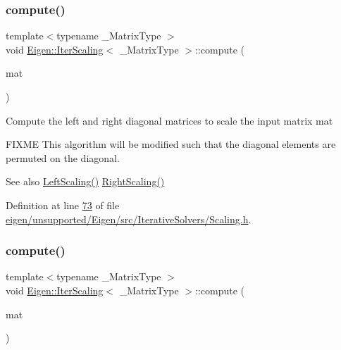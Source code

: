 \subsubsection{\texorpdfstring{compute()}{compute()}\hspace{0.1cm}{\footnotesize\ttfamily [1/2]}}
{\footnotesize\ttfamily template$<$typename \+\_\+\+Matrix\+Type $>$ \\
void \hyperlink{class_eigen_1_1_iter_scaling}{Eigen\+::\+Iter\+Scaling}$<$ \+\_\+\+Matrix\+Type $>$\+::compute (\begin{DoxyParamCaption}\item[{const Matrix\+Type \&}]{mat }\end{DoxyParamCaption})\hspace{0.3cm}{\ttfamily [inline]}}

Compute the left and right diagonal matrices to scale the input matrix {\ttfamily mat} 

F\+I\+X\+ME This algorithm will be modified such that the diagonal elements are permuted on the diagonal.

\begin{DoxySeeAlso}{See also}
\hyperlink{class_eigen_1_1_iter_scaling_ab88d288be912d90a1e597e5dab0bd47b}{Left\+Scaling()} \hyperlink{class_eigen_1_1_iter_scaling_a617229454935a6a4fda76b8af56c52ea}{Right\+Scaling()} 
\end{DoxySeeAlso}


Definition at line \hyperlink{eigen_2unsupported_2_eigen_2src_2_iterative_solvers_2_scaling_8h_source_l00073}{73} of file \hyperlink{eigen_2unsupported_2_eigen_2src_2_iterative_solvers_2_scaling_8h_source}{eigen/unsupported/\+Eigen/src/\+Iterative\+Solvers/\+Scaling.\+h}.

\mbox{\label{class_eigen_1_1_iter_scaling_a6a76754399fd004b3ac6011e272ffb71}} 
\subsubsection{\texorpdfstring{compute()}{compute()}\hspace{0.1cm}{\footnotesize\ttfamily [2/2]}}
{\footnotesize\ttfamily template$<$typename \+\_\+\+Matrix\+Type $>$ \\
void \hyperlink{class_eigen_1_1_iter_scaling}{Eigen\+::\+Iter\+Scaling}$<$ \+\_\+\+Matrix\+Type $>$\+::compute (\begin{DoxyParamCaption}\item[{const Matrix\+Type \&}]{mat }\end{DoxyParamCaption})\hspace{0.3cm}{\ttfamily [inline]}}

